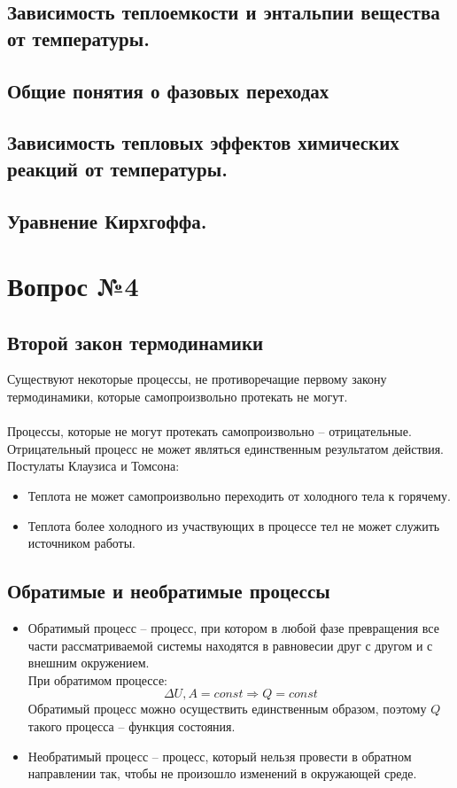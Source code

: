 \documentclass[14pt,a4paper]{scrartcl}
\begin{document}
		\subsection*{Зависимость теплоемкости и энтальпии вещества от температуры.} 
		\subsection*{Общие понятия о фазовых переходах} 		
		\subsection*{Зависимость тепловых эффектов химических реакций от температуры.} 		
		\subsection*{Уравнение Кирхгоффа.} 		


	\section*{Вопрос №4}
	
	\subsection*{Второй закон термодинамики} 
	Существуют некоторые процессы, не противоречащие первому закону термодинамики, которые самопроизвольно протекать не могут.\\ \\
	Процессы, которые не могут протекать самопроизвольно -- отрицательные. Отрицательный процесс не может являться единственным результатом действия. \\
	Постулаты Клаузиса и Томсона:
	\begin{itemize}
		\item Теплота не может самопроизвольно переходить от холодного тела к горячему.
		\item Теплота более холодного из участвующих в процессе тел не может служить источником работы.
	\end{itemize}
	\subsection*{Обратимые и необратимые процессы} 
	\begin{itemize}
		\item Обратимый процесс -- процесс, при котором в любой фазе превращения все части рассматриваемой системы находятся в равновесии друг с другом и с внешним окружением. \\
		При обратимом процессе: 
		$$ \Delta{U}, A = const  \Rightarrow Q = const  $$
		Обратимый процесс можно осуществить единственным образом, поэтому $Q$ такого процесса  -- функция состояния.
		\item Необратимый процесс -- процесс, который нельзя провести в обратном направлении так, чтобы не произошло изменений в окружающей среде.
	\end{itemize}
\end{document}
